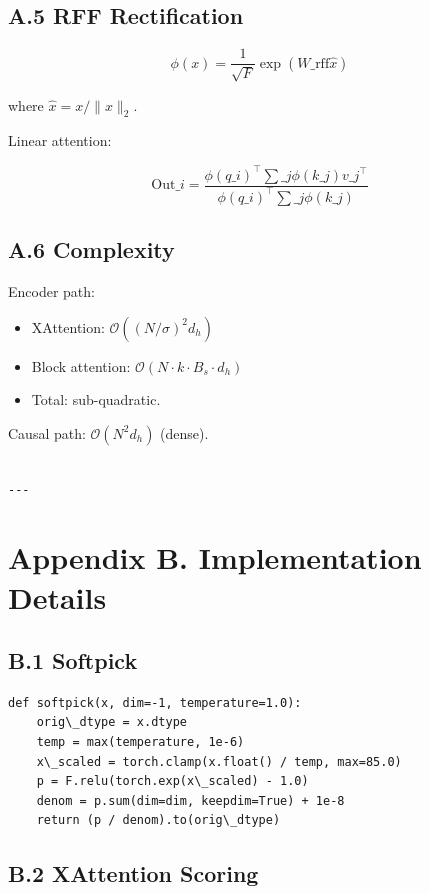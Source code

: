 \subsection{A.5 RFF Rectification}

\[
\phi(x) = \frac{1}{\sqrt{F}} \exp(W\_\text{rff} \hat{x})
\tag{A.6}
\]

where $\hat{x} = x / \|x\|_2$.

Linear attention:

\[
\text{Out}\_i = \frac{\phi(q\_i)^\top \sum\_j \phi(k\_j) v\_j^\top}{\phi(q\_i)^\top \sum\_j \phi(k\_j)}
\tag{A.7}
\]

\subsection{A.6 Complexity}

Encoder path:
\begin{itemize}
\item XAttention: $\mathcal{O}((N/\sigma)^2 d_h)$
\item Block attention: $\mathcal{O}(N \cdot k \cdot B_s \cdot d_h)$
\item Total: sub-quadratic.

\end{itemize}
Causal path: $\mathcal{O}(N^2 d_h)$ (dense).
\begin{lstlisting}

---
\end{lstlisting}

\section{Appendix B. Implementation Details}

\subsection{B.1 Softpick}

\begin{lstlisting}
def softpick(x, dim=-1, temperature=1.0):
    orig\_dtype = x.dtype
    temp = max(temperature, 1e-6)
    x\_scaled = torch.clamp(x.float() / temp, max=85.0)
    p = F.relu(torch.exp(x\_scaled) - 1.0)
    denom = p.sum(dim=dim, keepdim=True) + 1e-8
    return (p / denom).to(orig\_dtype)
\end{lstlisting}

\subsection{B.2 XAttention Scoring}


